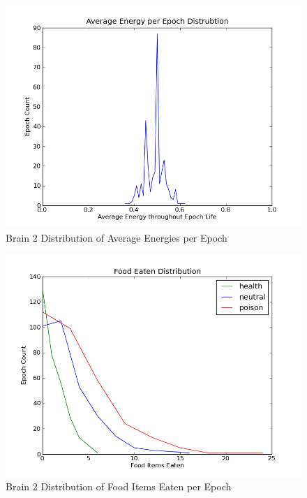 \documentclass[a4paper,11pt]{article}
\begin{document}
\begin{figure}
\begin{center}
  \includegraphics[scale=1.0]{img/brain2/avgenergyGauss-0.07.png}
  \caption{Brain 2 Distribution of Average Energies per Epoch}
  \label{fig:b2avgenergy}
\end{center}
\end{figure}

\begin{figure}
\begin{center}
  \includegraphics[scale=1.0]{img/brain2/foodGauss-h2.0-n5.16-p7.75.png}
  \caption{Brain 2 Distribution of Food Items Eaten per Epoch}
  \label{fig:b2food}
\end{center}
\end{figure}
\end{document}
